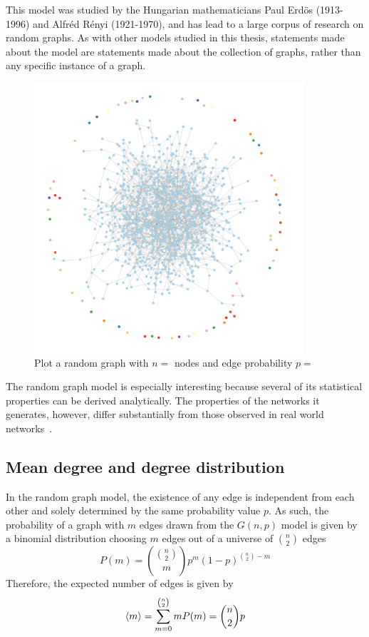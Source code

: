 This model was studied by the Hungarian mathematicians Paul Erd\"os (1913-1996) and Alfr\'ed R\'enyi (1921-1970), and has lead to a large corpus of research on random graphs.
As with other models studied in this thesis, statements made about the model are statements made about the collection of graphs, rather than any specific instance of a graph.

\begin{figure}[tb]
	\centering
	\includegraphics[width=10cm]{figures/gnp_hairball.png}
	\caption{Plot a random graph with $n = $ nodes and edge probability $p = $}
	\label{fig:figure1}
\end{figure}

The random graph model is especially interesting because several of its statistical properties can be derived analytically.
The properties of the networks it generates, however, differ substantially from those observed in real world networks~\cite{Albert:2002p4071}.


\subsection{Mean degree and degree distribution} %
\label{ssub:mean_degree_and_degree_distribution}


In the random graph model, the existence of any edge is independent from each other and solely determined by the same probability value $p$.
As such, the probability of a graph with $m$ edges drawn from the $G(n,p)$ model is given by a binomial distribution choosing $m$ edges out of a universe of $\binom{n}{2}$ edges
\begin{equation}
	P(m) = \binom{\binom{n}{2}}{m} p^m (1-p)^{\binom{n}{2}-m}
\end{equation}
Therefore, the expected number of edges is given by
\begin{equation}
	\left< m \right> = \sum^{\binom{n}{2}}_{m=0} m P(m) = \binom{n}{2} p
\end{equation}

